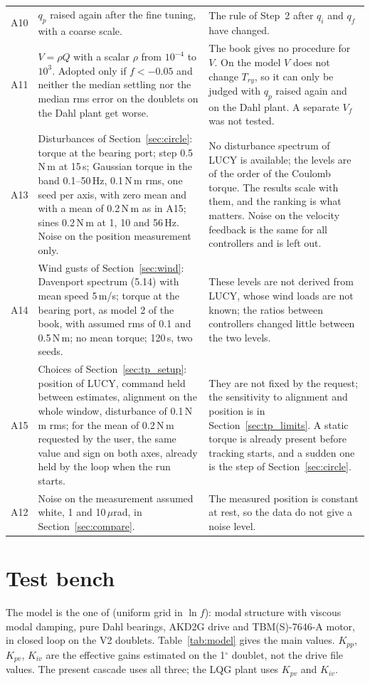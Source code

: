 \documentclass[10pt,a4paper]{article}
\numberwithin{equation}{section}
\begin{document}
\begin{table}[H]
\begin{tabular}{lL{7.2cm}L{8.4cm}}
A10 & $q_p$ raised again after the fine tuning, with a coarse scale. & The rule of Step~2 after $q_i$ and $q_f$ have changed. \\
A11 & $V=\rho Q$ with a scalar $\rho$ from $10^{-4}$ to $10^3$. Adopted only if $f<-0.05$ and neither the median settling nor the median rms error on the doublets on the Dahl plant get worse. & The book gives no procedure for $V$. On the model $V$ does not change $T_{ry}$, so it can only be judged with $q_p$ raised again and on the Dahl plant. A separate $V_f$ was not tested. \\
A13 & Disturbances of Section~\ref{sec:circle}: torque at the bearing port; step 0.5\,N\,m at 15\,s; Gaussian torque in the band 0.1--50\,Hz, 0.1\,N\,m rms, one seed per axis, with zero mean and with a mean of 0.2\,N\,m as in A15; sines 0.2\,N\,m at 1, 10 and 56\,Hz. Noise on the position measurement only. & No disturbance spectrum of LUCY is available; the levels are of the order of the Coulomb torque. The results scale with them, and the ranking is what matters. Noise on the velocity feedback is the same for all controllers and is left out. \\
A14 & Wind gusts of Section~\ref{sec:wind}: Davenport spectrum (5.14) with mean speed 5\,m/s; torque at the bearing port, as model 2 of the book, with assumed rms of 0.1 and 0.5\,N\,m; no mean torque; 120\,s, two seeds. & These levels are not derived from LUCY, whose wind loads are not known; the ratios between controllers changed little between the two levels. \\
A15 & Choices of Section~\ref{sec:tp_setup}: position of LUCY, command held between estimates, alignment on the whole window, disturbance of 0.1\,N\,m rms; for the mean of 0.2\,N\,m requested by the user, the same value and sign on both axes, already held by the loop when the run starts. & They are not fixed by the request; the sensitivity to alignment and position is in Section~\ref{sec:tp_limits}. A static torque is already present before tracking starts, and a sudden one is the step of Section~\ref{sec:circle}. \\
A12 & Noise on the measurement assumed white, 1 and 10\,$\mu$rad, in Section~\ref{sec:compare}. & The measured position is constant at rest, so the data do not give a noise level. \\ \bottomrule
\end{tabular}\end{table}

\section{Test bench}
The model is the one of  (uniform grid in $\ln f$): modal structure with viscous modal damping, pure Dahl bearings, AKD2G drive and TBM(S)-7646-A motor, in closed loop on the V2 doublets. Table~\ref{tab:model} gives the main values. $K_{pp}$, $K_{pv}$, $K_{iv}$ are the effective gains estimated on the 1$^\circ$ doublet, not the drive file values. The present cascade uses all three; the LQG plant uses $K_{pv}$ and $K_{iv}$.
\end{document}
